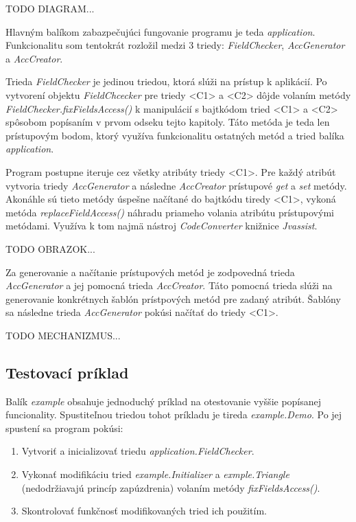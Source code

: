 \documentclass[11pt,final,oneside]{fithesis}
\begin{document}
TODO DIAGRAM...

Hlavným balíkom zabazpečujúci fungovanie programu je teda \textit{application}. Funkcionalitu som tentokrát rozložil medzi 3 triedy: \textit{FieldChecker}, \textit{AccGenerator} a \textit{AccCreator}.

Trieda \textit{FieldChecker} je jedinou triedou, ktorá slúži na prístup k aplikácií. Po vytvorení objektu \textit{FieldChcecker} pre triedy <C1> a <C2> dôjde volaním metódy \textit{FieldChecker.fixFieldsAccess()} k manipulácií s bajtkódom tried <C1> a <C2> spôsobom popísaním v prvom odseku tejto kapitoly. Táto metóda je teda len prístupovým bodom, ktorý využíva funkcionalitu ostatných metód a tried balíka \textit{application}.

Program postupne iteruje cez všetky atribúty triedy <C1>. Pre každý atribút vytvoria triedy \textit{AccGenerator} a následne \textit{AccCreator} prístupové \textit{get} a \textit{set} metódy. Akonáhle sú tieto metódy úspešne načítané do bajtkódu tiredy <C1>, vykoná metóda \textit{replaceFieldAccess()} náhradu priameho volania atribútu prístupovými metódami.
Využíva k tom najmä nástroj \textit{CodeConverter} knižnice \textit{Jvassist}.

TODO OBRAZOK...

Za generovanie a načítanie prístupových metód je zodpovedná trieda \textit{AccGenerator} a jej pomocná trieda \textit{AccCreator}. Táto pomocná trieda slúži na generovanie konkrétnych šablón prístpových metód pre zadaný atribút. Šablóny sa následne trieda \textit{AccGenerator} pokúsi načítať do triedy <C1>.


TODO MECHANIZMUS...

\subsection{Testovací príklad}
Balík \textit{example} obsahuje jednoduchý príklad na otestovanie vyššie popísanej funcionality. Spustiteľnou triedou tohot príkladu je tireda \textit{example.Demo}. Po jej spustení sa program pokúsi:

\begin{enumerate}
\item Vytvoriť a inicializovať triedu \textit{application.FieldChecker}.
\item Vykonať modifikáciu tried \textit{example.Initializer} a \textit{exmple.Triangle} (nedodržiavajú princíp zapúzdrenia) volaním metódy \textit{fixFieldsAccess()}.
\item Skontrolovať funkčnosť modifikovaných tried ich použitím.
\end{enumerate}
\end{document}
